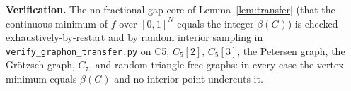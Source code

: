 \noindent\textbf{Verification.} The no-fractional-gap core of Lemma~\ref{lem:transfer}
(that the continuous minimum of $f$ over $[0,1]^N$ equals the integer $\beta(G)$) is
checked exhaustively-by-restart and by random interior sampling in
\texttt{verify\_graphon\_transfer.py} on C5, $C_5[2]$, $C_5[3]$, the Petersen graph, the
Gr\"otzsch graph, $C_7$, and random triangle-free graphs: in every case the vertex
minimum equals $\beta(G)$ and no interior point undercuts it.
